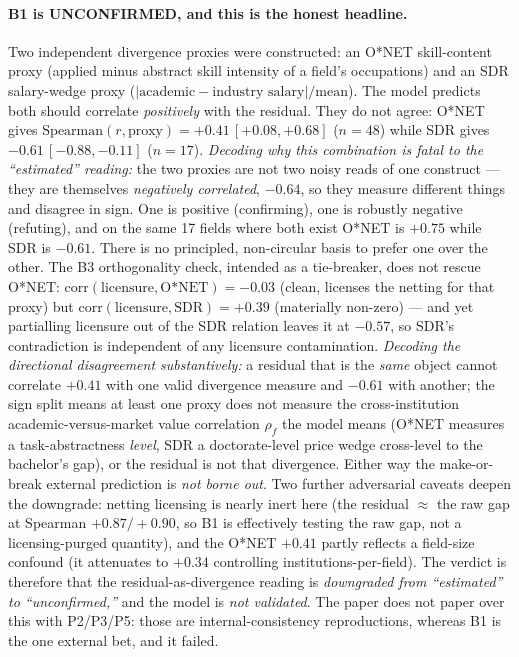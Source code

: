 \documentclass[11pt]{article}
\begin{document}
\paragraph{B1 is UNCONFIRMED, and this is the honest headline.} Two independent divergence proxies were constructed: an O*NET skill-content proxy (applied minus abstract skill intensity of a field's occupations) and an SDR salary-wedge proxy ($|\text{academic}-\text{industry salary}|/\text{mean}$). The model predicts both should correlate \emph{positively} with the residual. They do not agree: O*NET gives $\mathrm{Spearman}(r,\text{proxy})=+0.41\,[+0.08,+0.68]$ ($n=48$) while SDR gives $-0.61\,[-0.88,-0.11]$ ($n=17$). \emph{Decoding why this combination is fatal to the ``estimated'' reading:} the two proxies are not two noisy reads of one construct --- they are themselves \emph{negatively correlated}, $-0.64$, so they measure different things and disagree in sign. One is positive (confirming), one is robustly negative (refuting), and on the same 17 fields where both exist O*NET is $+0.75$ while SDR is $-0.61$. There is no principled, non-circular basis to prefer one over the other. The B3 orthogonality check, intended as a tie-breaker, does not rescue O*NET: $\mathrm{corr}(\text{licensure},\text{O*NET})=-0.03$ (clean, licenses the netting for that proxy) but $\mathrm{corr}(\text{licensure},\text{SDR})=+0.39$ (materially non-zero) --- and yet partialling licensure out of the SDR relation leaves it at $-0.57$, so SDR's contradiction is independent of any licensure contamination. \emph{Decoding the directional disagreement substantively:} a residual that is the \emph{same} object cannot correlate $+0.41$ with one valid divergence measure and $-0.61$ with another; the sign split means at least one proxy does not measure the cross-institution academic-versus-market value correlation $\rho_f$ the model means (O*NET measures a task-abstractness \emph{level}, SDR a doctorate-level price wedge cross-level to the bachelor's gap), or the residual is not that divergence. Either way the make-or-break external prediction is \emph{not borne out}. Two further adversarial caveats deepen the downgrade: netting licensing is nearly inert here (the residual $\approx$ the raw gap at Spearman $+0.87/+0.90$, so B1 is effectively testing the raw gap, not a licensing-purged quantity), and the O*NET $+0.41$ partly reflects a field-size confound (it attenuates to $+0.34$ controlling institutions-per-field). The verdict is therefore that the residual-as-divergence reading is \emph{downgraded from ``estimated'' to ``unconfirmed,''} and the model is \emph{not validated}. The paper does not paper over this with P2/P3/P5: those are internal-consistency reproductions, whereas B1 is the one external bet, and it failed.
\end{document}
